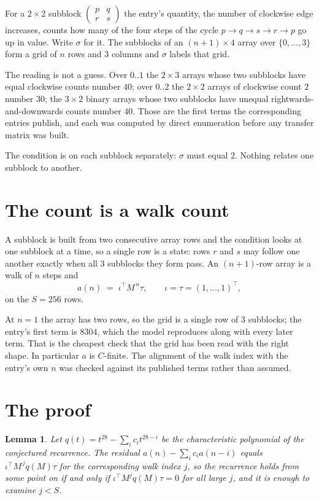 \documentclass[11pt,a4paper]{article}
\theoremstyle{plain}
\newtheorem{lemma}[theorem]{Lemma}
\theoremstyle{definition}
\begin{document}
For a $2\times2$ subblock $\begin{pmatrix}p&q\\r&s\end{pmatrix}$ the
entry's quantity, the number of clockwise edge increases, counts how many of the four steps of the cycle $p\to q\to s\to r\to p$ go up in value. Write $\sigma$ for it. The subblocks of an
$(n+1)\times4$ array over $\{0,\dots,3\}$ form a grid of $n$ rows and $3$
columns and $\sigma$ labels that grid.

The reading is not a guess. Over $0..1$ the $2\times3$ arrays whose two subblocks have equal
clockwise counts number $40$; over $0..2$ the $2\times2$ arrays of clockwise count $2$ number
$30$; the $3\times2$ binary arrays whose two subblocks have unequal rightwards-and-downwards
counts number $40$. Those are the first terms the corresponding entries publish, and each was
computed by direct enumeration before any transfer matrix was built.

The condition is on each subblock separately: $\sigma$ must equal $2$. Nothing
relates one subblock to another.

\section{The count is a walk count}

A subblock is built from two consecutive array rows and the condition looks
at one subblock at a time, so a single row is a state: rows $r$ and $s$ may follow one another
exactly when all $3$ subblocks they form pass. An $(n+1)$-row array is a walk of $n$ steps and
\[
a(n)\;=\;\iota^{\!\top}M^{\,n}\tau,\qquad\iota=\tau=(1,\dots,1)^{\!\top},
\]
on the $S=256$ rows.

At $n=1$ the array has two rows, so the grid is a single row of $3$
subblocks; the entry's first term is $8304$, which the model
reproduces along with every later term. That is the cheapest check that the grid has been read
with the right shape.
In particular $a$ is $C$-finite. The alignment of the walk index with the entry's own $n$ was
checked against its published terms rather than assumed.

\section{The proof}

\begin{lemma}\label{lem:crit}
Let $q(t)=t^{28}-\sum_i c_it^{28-i}$ be the characteristic polynomial of the
conjectured recurrence. The residual $a(n)-\sum_ic_ia(n-i)$ equals
$\iota^{\!\top}M^{\,j}q(M)\tau$ for the corresponding walk index $j$, so the recurrence
holds from some point on if and only if $\iota^{\!\top}M^{j}q(M)\tau=0$ for all large $j$,
and it is enough to examine $j<S$.
\end{lemma}
\end{document}
